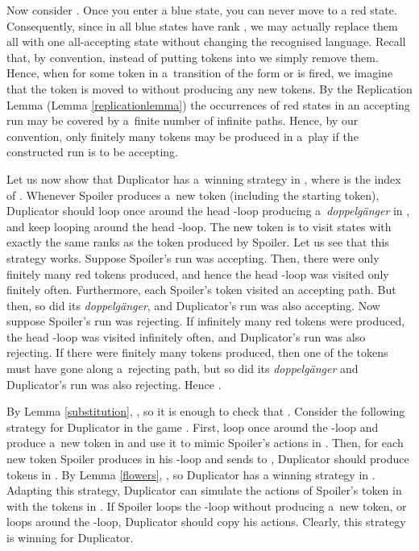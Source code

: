 \documentclass{LMCS}
\begin{document}
Now consider . Once you enter a blue state, you can never move to a red state. Consequently, since in  all blue states have rank , we may actually replace them all with one all-accepting state  without changing the recognised language. Recall that, by convention, instead of putting tokens into  we simply remove them. Hence, when for some token in  a~transition of the form  or  is fired, we imagine that the token is moved to  without producing any new tokens. By the Replication Lemma (Lemma \ref{replicationlemma}) the occurrences of red states in an accepting run may be covered by a~finite number of infinite paths. Hence, by our convention, only finitely many tokens may be produced in a~play if the constructed run is to be accepting.
 
Let us now show that Duplicator has a~winning strategy in  , where  is the index of .  Whenever Spoiler produces a~new token (including the starting token), Duplicator should loop once around the head -loop producing a~{\em doppelg\"anger}  in , and keep looping around the head -loop. The new token is to visit states with exactly the same ranks as the token produced by Spoiler. Let us see that this strategy works. Suppose Spoiler's run was accepting. Then, there were only finitely many red tokens produced, and hence the head -loop was visited only finitely often. Furthermore, each Spoiler's token visited an accepting path. But then, so did its {\em doppelg\"anger}, and Duplicator's run was also accepting. Now suppose Spoiler's run was rejecting. If infinitely many red tokens were produced, the head -loop was visited infinitely often, and Duplicator's run was also rejecting. If there were finitely many tokens produced, then one of the tokens must have gone along a~rejecting path, but so did its {\em doppelg\"anger} and Duplicator's run was also rejecting. Hence . 

By Lemma \ref{substitution}, , so it is enough to check that  . Consider the following strategy for Duplicator in the game . First, loop once around the -loop and produce a~new token in  and use it to mimic Spoiler's actions in . Then, for each new token  Spoiler produces in his -loop and sends to , Duplicator should produce tokens  in . By Lemma \ref{flowers}, , so Duplicator has a winning strategy in . Adapting this strategy, Duplicator can simulate the actions of Spoiler's token  in  with the tokens  in . If Spoiler loops the -loop without producing a~new token, or loops around the -loop, Duplicator should copy his actions. Clearly, this strategy is winning for Duplicator.  
\end{document}
